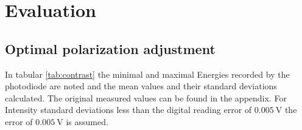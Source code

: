 \section{Evaluation}


\subsection{Optimal polarization adjustment}
In tabular \ref{tab:contrast} the minimal and maximal Energies recorded by the
photodiode are noted and the mean values and their standard deviations
calculated. The original measured values can be found in the appendix. For
Intensity standard deviations less than the digital reading error of
$\qty{0.005}{\volt}$ the error of $ \qty{0.005}{\volt}$ is assumed.

